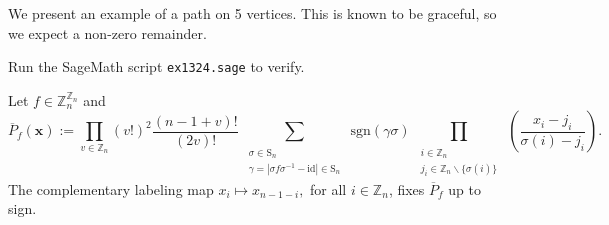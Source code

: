 \begin{example} We present an example of a path on 5 vertices. This is known to be graceful, so we expect a non-zero remainder.
\ \\
\begin{center}   
\end{center}
Run the SageMath script \texttt{ex1324.sage} to verify.
\end{example}
\begin{proposition}\label{prop:complementary-labeling-Symmetry}
Let $f\in\mathbb{Z}_{n}^{\mathbb{Z}_{n}}$ and
\begin{equation}
\overline{P}_f(\mathbf{x}):=\prod_{v\in\mathbb{Z}_{n}}\left(v!\right)^{2}\frac{\left(n-1+v\right)!}{\left(2v\right)!}\sum_{\begin{array}{c}
\substack{\sigma\in\text{S}_{n}\\
\gamma=\left|\sigma f\sigma^{-1}-\text{id}\right|\in\text{S}_{n}
}
\end{array}}\text{sgn}(\gamma\sigma)\prod_{\begin{array}{c}
\substack{i\in\mathbb{Z}_{n}\\
j_{i}\in\mathbb{Z}_{n}\backslash\{\sigma(i)\}
}
\end{array}}\left(\frac{x_{i}-j_{i}}{\sigma(i)-j_{i}}\right). 
\end{equation}
The complementary labeling map $x_{i}\mapsto x_{n-1-i},$ for all $i\in \mathbb{Z}_n$,
fixes $\overline{P}_f$ up to sign.
\end{proposition}
